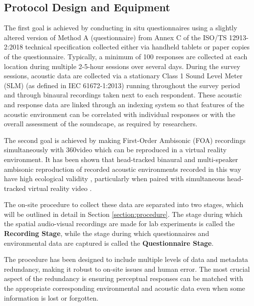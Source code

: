  \subsection{Protocol Design and Equipment}
   \label{section:design}
   The first goal is achieved by conducting in situ questionnaires using a slightly altered version of Method A (questionnaire) from Annex C of the ISO/TS 12913-2:2018 technical specification \citep{ISO12913_2_2018IOS} collected either via handheld tablets or paper copies of the questionnaire. Typically, a minimum of 100 responses are collected at each location during multiple 2-5-hour sessions over several days. During the survey sessions, acoustic data are collected via a stationary Class 1 Sound Level Meter (SLM) (as defined in IEC 61672-1:2013) running throughout the survey period and through binaural recordings taken next to each respondent. %
   These acoustic and response data are linked through an indexing system so that features of the acoustic environment can be correlated with individual responses or with the overall assessment of the soundscape, as required by researchers.

   The second goal is achieved by making First-Order Ambisonic (FOA) recordings simultaneously with 360\degree video which can be reproduced in a virtual reality environment. It has been shown that head-tracked binaural and multi-speaker ambisonic reproduction of recorded acoustic environments recorded in this way have high ecological validity \citep{Davies2014Soundscape}, particularly when paired with simultaneous head-tracked virtual reality video \citep{Hong2017Spatial,Hong2018Quality,DeCoensel2017Urban}.

   The on-site procedure to collect these data are separated into two stages, which will be outlined in detail in Section \ref{section:procedure}. The stage during which the spatial audio-visual recordings are made for lab experiments is called the \textbf{Recording Stage}, while the stage during which questionnaires and environmental data are captured is called the \textbf{Questionnaire Stage}.

   The procedure has been designed to include multiple levels of data and metadata redundancy, making it robust to on-site issues and human error. The most crucial aspect of the redundancy is ensuring perceptual responses can be matched with the appropriate corresponding environmental and acoustic data even when some information is lost or forgotten.

